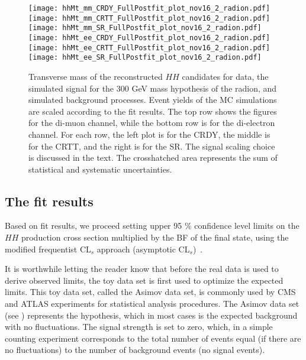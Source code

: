 \begin{figure}[H]
\begin{center}
\texttt{[image: hhMt\_mm\_CRDY\_FullPostfit\_plot\_nov16\_2\_radion.pdf]}
\texttt{[image: hhMt\_mm\_CRTT\_FullPostfit\_plot\_nov16\_2\_radion.pdf]}
\texttt{[image: hhMt\_mm\_SR\_FullPostfit\_plot\_nov16\_2\_radion.pdf]} \\
\texttt{[image: hhMt\_ee\_CRDY\_FullPostfit\_plot\_nov16\_2\_radion.pdf]}
\texttt{[image: hhMt\_ee\_CRTT\_FullPostfit\_plot\_nov16\_2\_radion.pdf]}
\texttt{[image: hhMt\_ee\_SR\_FullPostfit\_plot\_nov16\_2\_radion.pdf]}
\caption[Transverse mass of the reconstructed $HH$ candidates for radion hypothesis.]{Transverse mass of the reconstructed $HH$ candidates for data, the simulated signal for the 300 GeV mass hypothesis of the radion, and simulated background processes. Event yields of the MC simulations are scaled according to the fit results. The top row shows the figures for the di-muon channel, while the bottom row is for the di-electron channel. For each row, the left plot is for the CRDY, the middle is for the CRTT, and the right is for the SR. The signal scaling choice is discussed in the text. The crosshatched area represents the sum of statistical and systematic uncertainties.}
\label{MCcomparisons_radion} 
\end{center}
\end{figure}

\subsection{The fit results}
\label{sec:fit_results}

Based on fit results, we proceed setting upper 95 \% confidence level limits on the $HH$ production cross section multiplied by the BF of the final state, using the modified frequentist CL$_s$ approach (asymptotic CL$_s$)~\cite{Junk:1999kv, LEP-CLs, HIG-11-011, Cowan:2010js}. 

It is worthwhile letting the reader know that before the real data is used to derive observed limits, the toy data set is first used to optimize the expected limits. This toy data set, called the Asimov data set, is commonly used by CMS and ATLAS experiments for statistical analysis procedures. The Asimov data set (see \cite{Cowan:2010js}) represents the hypothesis, which in most cases is the expected background with no fluctuations. The signal strength is set to zero, which, in a simple counting experiment \cite{expected_limit_asimov} corresponds to the total number of events equal (if there are no fluctuations) to the number of background events (no signal events). 

